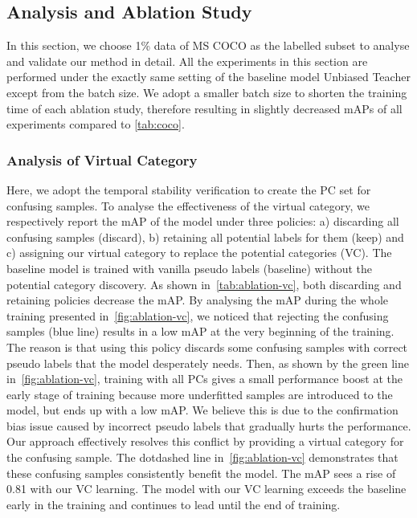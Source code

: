 \documentclass[runningheads]{llncs}
\begin{document}
\subsection{Analysis and Ablation Study}

In this section, we choose 1\% data of MS COCO as the labelled subset to analyse and validate our method in detail. All the experiments in this section are performed under the exactly same setting of the baseline model Unbiased Teacher except from the batch size. We adopt a smaller batch size to shorten the training time of each ablation study, therefore resulting in slightly decreased mAPs of all experiments compared to \cref{tab:coco}.

\subsubsection{Analysis of Virtual Category}
Here, we adopt the temporal stability verification to create the PC set for confusing samples. To analyse the effectiveness of the virtual category, we respectively report the mAP of the model under three policies: a) discarding all confusing samples (discard), b) retaining all potential labels for them (keep) and c) assigning our virtual category to replace the potential categories (VC). The baseline model is trained with vanilla pseudo labels (baseline) without the potential category discovery. As shown in~\cref{tab:ablation-vc}, both discarding and retaining policies decrease the mAP. By analysing the mAP during the whole training presented in~\cref{fig:ablation-vc}, we noticed that rejecting the confusing samples (blue line) results in a low mAP at the very beginning of the training. The reason is that using this policy discards some confusing samples with correct pseudo labels that the model desperately needs. Then, as shown by the green line in~\cref{fig:ablation-vc}, training with all PCs gives a small performance boost at the early stage of training because more underfitted samples are introduced to the model, but ends up with a low mAP. We believe this is due to the confirmation bias issue caused by incorrect pseudo labels that gradually hurts the performance. Our approach effectively resolves this conflict by providing a virtual category for the confusing sample.  The dotdashed line in~\cref{fig:ablation-vc} demonstrates that these confusing samples consistently benefit the model. The mAP sees a rise of 0.81 with our VC learning. The model with our VC learning exceeds the baseline early in the training and continues to lead until the end of training. 
\end{document}
